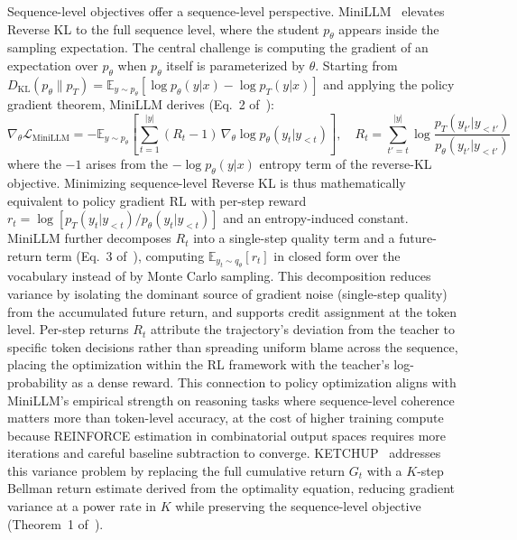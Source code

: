 \documentclass{article} %
\newcommand{\E}{\mathbb{E}}
\newcommand{\KL}{D_{\mathrm{KL}}}
\newcommand{\ptheta}{p_\theta}
\newcommand{\pteacher}{p_T}
\newcommand{\loss}{\mathcal{L}}
\begin{document}
Sequence-level objectives offer a sequence-level perspective. MiniLLM~\citep{2306.08543} elevates Reverse KL to the full sequence level, where the student $\ptheta$ appears inside the sampling expectation. The central challenge is computing the gradient of an expectation over $\ptheta$ when $\ptheta$ itself is parameterized by $\theta$. Starting from $\KL(\ptheta \parallel \pteacher) = \E_{y \sim \ptheta}[\log \ptheta(y|x) - \log \pteacher(y|x)]$ and applying the policy gradient theorem, MiniLLM derives (Eq.~2 of~\citealp{2306.08543}):
\begin{equation*}
    \nabla_\theta \loss_{\text{MiniLLM}} = -\E_{y \sim \ptheta} \left[ \sum_{t=1}^{|y|} (R_t - 1)\, \nabla_\theta \log \ptheta(y_t|y_{<t}) \right],\quad R_t = \sum_{t'=t}^{|y|} \log \frac{\pteacher(y_{t'}|y_{<t'})}{\ptheta(y_{t'}|y_{<t'})}
\end{equation*}
where the $-1$ arises from the $-\log \ptheta(y|x)$ entropy term of the reverse-KL objective. Minimizing sequence-level Reverse KL is thus mathematically equivalent to policy gradient RL with per-step reward $r_t = \log[\pteacher(y_t|y_{<t}) / \ptheta(y_t|y_{<t})]$ and an entropy-induced constant. MiniLLM further decomposes $R_t$ into a single-step quality term and a future-return term (Eq.~3 of~\citealp{2306.08543}), computing $\E_{y_t \sim q_\theta}[r_t]$ in closed form over the vocabulary instead of by Monte Carlo sampling. This decomposition reduces variance by isolating the dominant source of gradient noise (single-step quality) from the accumulated future return, and supports credit assignment at the token level. Per-step returns $R_t$ attribute the trajectory's deviation from the teacher to specific token decisions rather than spreading uniform blame across the sequence, placing the optimization within the RL framework with the teacher's log-probability as a dense reward. This connection to policy optimization aligns with MiniLLM's empirical strength on reasoning tasks where sequence-level coherence matters more than token-level accuracy, at the cost of higher training compute because REINFORCE estimation in combinatorial output spaces requires more iterations and careful baseline subtraction to converge. KETCHUP~\citep{2504.19024} addresses this variance problem by replacing the full cumulative return $G_t$ with a $K$-step Bellman return estimate derived from the optimality equation, reducing gradient variance at a power rate in $K$ while preserving the sequence-level objective (Theorem~1 of~\citealp{2504.19024}).
\end{document}
